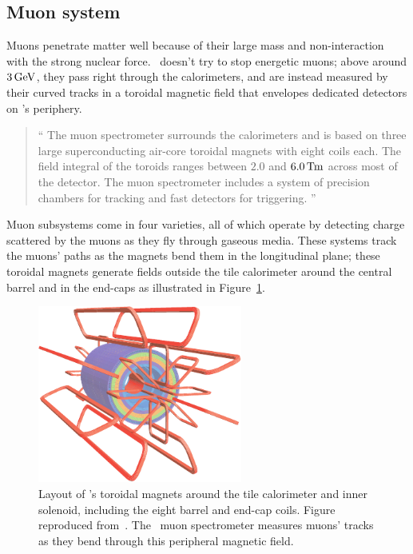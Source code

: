\subsection{Muon system}
\label{sec:atlas_muon}
Muons penetrate matter well because of their large mass and non-interaction
with the strong nuclear force.
\atlas\ doesn't try to stop energetic muons;
above around $3\,\eV[G]$, they pass right through the calorimeters, and are
instead measured by their curved tracks in a toroidal magnetic field that
envelopes dedicated detectors on \atlas's periphery.
\begin{quote}
``%
The muon spectrometer surrounds the calorimeters and is based on three large
superconducting air-core toroidal magnets with eight coils each.
The field integral of the toroids ranges between $2.0$ and
$6.0\,\mathrm{T\kern-0.15ex m}$ across most of the detector.
The muon spectrometer includes a system of precision chambers for tracking and
fast detectors for triggering.%
''~\cite{atlas2022searches}
\end{quote}
Muon subsystems come in four varieties, all of which operate by detecting
charge scattered by the muons as they fly through gaseous media.
These systems track the muons' paths as the magnets bend them in the
longitudinal plane; these toroidal magnets generate fields outside the tile
calorimeter around the central barrel and in the end-caps as illustrated in
Figure~\ref{fig:atlas_magnets}.

\begin{figure}[tp]
\centering
\includegraphics[width=0.6\textwidth]{figures/atlas_magnets.pdf}
\caption[
Layout of \atlas's toroidal magnets around the tile calorimeter and inner
solenoid
]{%
Layout of \atlas's toroidal magnets around the tile calorimeter and inner
solenoid, including the eight barrel and end-cap coils.
Figure reproduced from~\cite{atlas2008experiment}.
The \atlas\ muon spectrometer measures muons' tracks as they bend through
this peripheral magnetic field.
}
\label{fig:atlas_magnets}
\end{figure}

